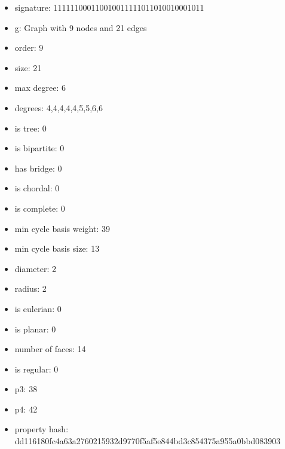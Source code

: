 \newpage
\begin{figure}
\end{figure}
\begin{itemize}
\item signature: 111111000110010011111011010010001011
\item g: Graph with 9 nodes and 21 edges
\item order: 9
\item size: 21
\item max degree: 6
\item degrees: 4,4,4,4,4,5,5,6,6
\item is tree: 0
\item is bipartite: 0
\item has bridge: 0
\item is chordal: 0
\item is complete: 0
\item min cycle basis weight: 39
\item min cycle basis size: 13
\item diameter: 2
\item radius: 2
\item is eulerian: 0
\item is planar: 0
\item number of faces: 14
\item is regular: 0
\item p3: 38
\item p4: 42
\item property hash: dd116180fc4a63a2760215932d9770f5af5e844bd3c854375a955a0bbd083903
\end{itemize}
